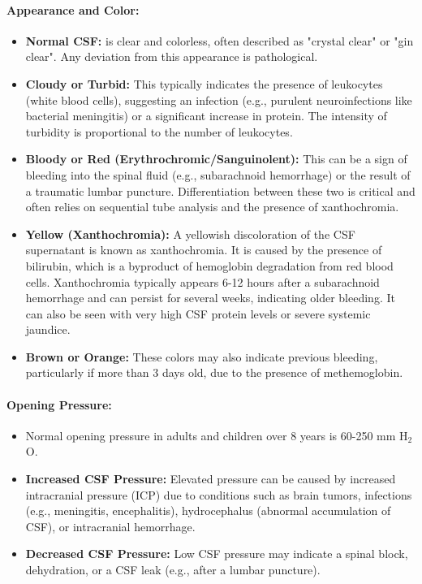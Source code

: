 	\paragraph{Appearance and Color:}
	\begin{itemize}
		\item \textbf{Normal CSF:} is clear and colorless, often described as "crystal clear" or "gin clear". Any deviation from this appearance is pathological.
		\item \textbf{Cloudy or Turbid:} This typically indicates the presence of leukocytes (white blood cells), suggesting an infection (e.g., purulent neuroinfections like bacterial meningitis) or a significant increase in protein. The intensity of turbidity is proportional to the number of leukocytes.
		\item \textbf{Bloody or Red (Erythrochromic/Sanguinolent):} This can be a sign of bleeding into the spinal fluid (e.g., subarachnoid hemorrhage) or the result of a traumatic lumbar puncture. Differentiation between these two is critical and often relies on sequential tube analysis and the presence of xanthochromia.
		\item \textbf{Yellow (Xanthochromia):} A yellowish discoloration of the CSF supernatant is known as xanthochromia. It is caused by the presence of bilirubin, which is a byproduct of hemoglobin degradation from red blood cells. Xanthochromia typically appears 6-12 hours after a subarachnoid hemorrhage and can persist for several weeks, indicating older bleeding. It can also be seen with very high CSF protein levels or severe systemic jaundice.
		\item \textbf{Brown or Orange:} These colors may also indicate previous bleeding, particularly if more than 3 days old, due to the presence of methemoglobin.
	\end{itemize}
	
	\paragraph{Opening Pressure:}
	\begin{itemize}
		\item Normal opening pressure in adults and children over 8 years is 60-250 mm H$_2$O.
		\item \textbf{Increased CSF Pressure:} Elevated pressure can be caused by increased intracranial pressure (ICP) due to conditions such as brain tumors, infections (e.g., meningitis, encephalitis), hydrocephalus (abnormal accumulation of CSF), or intracranial hemorrhage.
		\item \textbf{Decreased CSF Pressure:} Low CSF pressure may indicate a spinal block, dehydration, or a CSF leak (e.g., after a lumbar puncture).
	\end{itemize}
	
